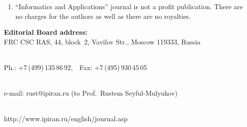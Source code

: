 {\begin{enumerate}[1.]
\item ``Informatics and Applications'' journal is not a profit publication. There are no
charges for the authors as well as there are no royalties.\\[-13.5pt]
\end{enumerate}

\def\leftfootline{\small{\textbf{\thepage}
\hfill INFORMATIKA I EE PRIMENENIYA~--- INFORMATICS AND APPLICATIONS\ \ \ 2016\
\ \ volume~10\ \ \ issue\ 2}
}%
 \def\rightfootline{\small{INFORMATIKA I EE PRIMENENIYA~--- INFORMATICS AND APPLICATIONS\ \ \ 2016\ \ \ volume~10\ \ \ issue\ 2
\hfill \textbf{\thepage}}}

\def\leftkol{Requirements for manuscripts submitted to Journal
``Informatics~and~Applications''}

\def\rightkol{Requirements for manuscripts submitted to Journal
``Informatics~and~Applications''}




\begin{center}
\textbf{Editorial Board address:} \\




FRC CSC RAS, 44, block~2, Vavilov Str., Moscow 119333, Russia\\[-10pt]

\

Ph.: +7\,(499)\,135\,86\,92,\ \ Fax: +7\,(495)\,930\,45\,05\\[-10pt]

\

 e-mail: {\sf rust@ipiran.ru} (to Prof.\ Rustem Seyful-Mulyukov)\\[-10pt]

\

 {\sf http://www.ipiran.ru/english/journal.asp}
\end{center}
 }
\def\leftfootline{\small{\textbf{\thepage}
\hfill INFORMATIKA I EE PRIMENENIYA~--- INFORMATICS AND APPLICATIONS\ \ \ 2016\
\ \ volume~10\ \ \ issue\ 2}
}%
 \def\rightfootline{\small{INFORMATIKA I EE PRIMENENIYA~--- INFORMATICS AND APPLICATIONS\ \ \ 2016\ \ \ volume~10\ \ \ issue\ 2
\hfill \textbf{\thepage}}}

 \label{end\stat}

\newpage
